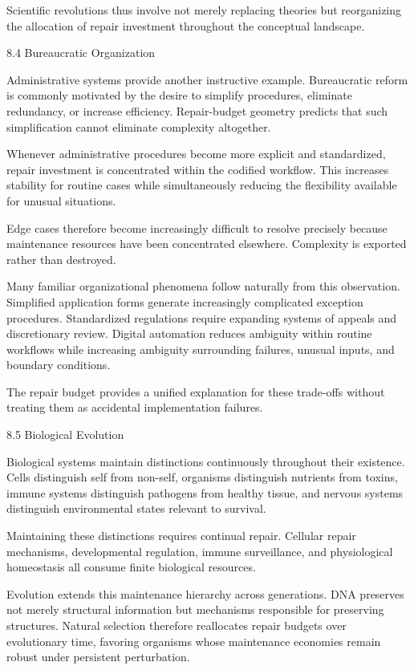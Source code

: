 \documentclass[12pt,oneside]{article}
\theoremstyle{plain}
\theoremstyle{definition}
\theoremstyle{remark}
\begin{document}
Scientific revolutions thus involve not merely replacing theories but reorganizing the allocation of repair investment throughout the conceptual landscape.

8.4 Bureaucratic Organization

Administrative systems provide another instructive example. Bureaucratic reform is commonly motivated by the desire to simplify procedures, eliminate redundancy, or increase efficiency. Repair-budget geometry predicts that such simplification cannot eliminate complexity altogether.

Whenever administrative procedures become more explicit and standardized, repair investment is concentrated within the codified workflow. This increases stability for routine cases while simultaneously reducing the flexibility available for unusual situations.

Edge cases therefore become increasingly difficult to resolve precisely because maintenance resources have been concentrated elsewhere. Complexity is exported rather than destroyed.

Many familiar organizational phenomena follow naturally from this observation. Simplified application forms generate increasingly complicated exception procedures. Standardized regulations require expanding systems of appeals and discretionary review. Digital automation reduces ambiguity within routine workflows while increasing ambiguity surrounding failures, unusual inputs, and boundary conditions.

The repair budget provides a unified explanation for these trade-offs without treating them as accidental implementation failures.

8.5 Biological Evolution

Biological systems maintain distinctions continuously throughout their existence. Cells distinguish self from non-self, organisms distinguish nutrients from toxins, immune systems distinguish pathogens from healthy tissue, and nervous systems distinguish environmental states relevant to survival.

Maintaining these distinctions requires continual repair. Cellular repair mechanisms, developmental regulation, immune surveillance, and physiological homeostasis all consume finite biological resources.

Evolution extends this maintenance hierarchy across generations. DNA preserves not merely structural information but mechanisms responsible for preserving structures. Natural selection therefore reallocates repair budgets over evolutionary time, favoring organisms whose maintenance economies remain robust under persistent perturbation.
\end{document}
